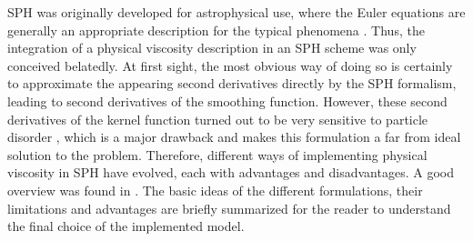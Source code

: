 \documentclass{report}
\begin{document}
SPH was originally developed for astrophysical use, where the Euler equations are generally an appropriate description for the typical phenomena \cite{Liu2003}. Thus, the integration of a physical viscosity description in an SPH scheme was only conceived belatedly. 
At first sight, the most obvious way of doing so is certainly to approximate the appearing second derivatives directly by the SPH formalism, leading to second derivatives of the smoothing function. However, these second derivatives of the kernel function turned out to be very sensitive to particle disorder \cite{Brookshaw1986,Monaghan1988}, which is a major drawback and makes this formulation a far from ideal solution to the problem. Therefore, different ways of implementing physical viscosity in SPH have evolved, each with advantages and disadvantages. A good overview was found in \cite{Basa2009}. The basic ideas of the different formulations, their limitations and advantages are briefly summarized for the reader to understand the final choice of the implemented model.
\end{document}
